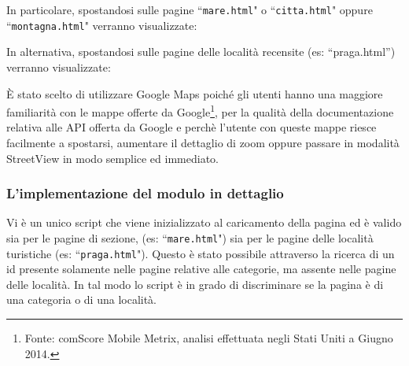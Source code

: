 \begin{flushleft}
In particolare, spostandosi sulle pagine ``\texttt{mare.html}" o
``\texttt{citta.html}" oppure ``\texttt{montagna.html}" verranno visualizzate:
\end{flushleft}
\begin{flushleft}
In alternativa, spostandosi sulle pagine delle località recensite (es: “praga.html”) verranno visualizzate:
\end{flushleft}
È stato scelto di utilizzare Google Maps poiché gli utenti hanno una maggiore
familiarità con le mappe offerte da Google\footnote{ Fonte: comScore Mobile
Metrix, analisi effettuata negli Stati Uniti a Giugno 2014.}, per la qualità
della documentazione relativa alle API offerta da Google e perchè l'utente con
queste mappe riesce facilmente a spostarsi, aumentare il dettaglio di zoom
oppure passare in modalità StreetView in modo semplice ed immediato.

\subsubsection{L'implementazione del modulo in dettaglio}

Vi è un unico script che viene inizializzato al caricamento della pagina ed è
valido sia per le pagine di sezione, (es: ``\texttt{mare.html}") sia per le
pagine delle località turistiche (es: ``\texttt{praga.html}").
Questo è stato possibile attraverso la ricerca di un id presente solamente
nelle pagine relative alle categorie, ma assente nelle pagine delle località.
In tal modo lo script è in grado di discriminare se la pagina è di una
categoria o di una località.

